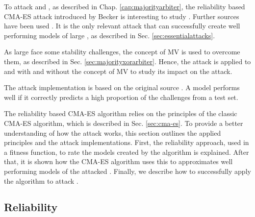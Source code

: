 To attack \mpufs and \mxpufs, as described in Chap. \ref{cap:majorityarbiter}, the reliability based \ac{CMA-ES} attack introduced by Becker is interesting to study \cite{Becker2015ThePUFs}.
Further sources have been used \cite{Becker2015ThePUFs,Wikipedia2017CMA-ES, Hansen2011TheTutorial, Hansen2006TheReview}. %
It is the only relevant attack that can successfully create well performing models of large \xpufs, as described in Sec. \ref{sec:essentialattacks}.

As large \xpufs face some stability challenges, the concept of \ac{MV} is used to overcome them, as described in Sec. \ref{sec:majorityxorarbiter}.
Hence, the attack is applied to \apufs and \xpufs with and without the concept of \ac{MV} to study its impact on the attack. %

The attack implementation is based on the original source \cite{Becker2015ThePUFs}.
A model performs well if it correctly predicts a high proportion of the challenges from a test set.

The reliability based \ac{CMA-ES} algorithm relies on the principles of the classic \ac{CMA-ES} algorithm, which is described in Sec. \ref{sec:cma-es}.
To provide a better understanding of how the attack works, this section outlines the applied principles and the attack implementations. %
First, the reliability approach, used in a fitness function, to rate the models created by the algorithm is explained.
After that, it is shown how the \ac{CMA-ES} algorithm uses this to approximates well performing models of the attacked \apuf.
Finally, we describe how to successfully apply the algorithm to attack \xpufs.


\subsection{Reliability}
\label{sec:reliability}

